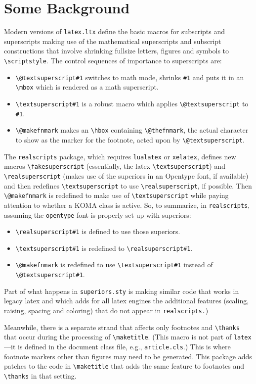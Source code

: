 \documentclass[11pt]{article}
\begin{document}
\section*{Some Background}
Modern versions of {\tt latex.ltx} define the basic macros for subscripts and superscripts making use of the mathematical superscripts and subscript constructions that involve shrinking fullsize letters, figures and symbols to \verb|\scriptstyle|. The control sequences of importance to superscripts are:
\begin{itemize}
\item
\verb|\@textsuperscript#1| switches to math mode, shrinks \verb|#1| and puts it in an \verb|\mbox| which is rendered as a math superscript.
\item 
\verb|\textsuperscript#1| is a robust macro which applies \verb|\@textsuperscript| to \verb|#1|.
\item 
\verb|\@makefnmark| makes an \verb|\hbox| containing  \verb|\@thefnmark|, the actual character to show as the marker for the footnote, acted upon by \verb|\@textsuperscript|. 
\end{itemize}
The {\tt realscripts} package, which requires {\tt lualatex} or {\tt xelatex}, defines new macros \verb|\fakesuperscript| (essentially, the latex \verb|\textsuperscript|) and \verb|\realsuperscript| (makes use of the superiors in an Opentype font, if available) and then redefines \verb|\textsuperscript| to use \verb|\realsuperscript|, if possible. Then \verb|\@makefnmark| is redefined to make use of \verb|\textsuperscript| while paying attention to whether a KOMA class is active. So, to summarize, in {\tt realscripts}, assuming the {\tt opentype} font is properly set up with superiors:
\begin{itemize}
\item
\verb|\realsuperscript#1| is defined to use those superiors.
\item
\verb|\textsuperscript#1| is redefined to \verb|\realsuperscript#1|.
\item
\verb|\@makefnmark| is redefined to use \verb|\textsuperscript#1| instead of \verb|\@textsuperscript#1|.
\end{itemize}

Part of what happens in {\tt superiors.sty} is making similar code that works in legacy latex and which adds for all latex engines the additional features (scaling, raising, spacing and coloring) that do not appear in {\tt realscripts.})

Meanwhile, there is a separate strand that affects only footnotes and \verb|\thanks| that occur during the processing of \verb|\maketitle|. (This macro is not part of {\tt latex}---it is defined in the document class file, e.g., {\tt article.cls}.) This is where footnote markers other than figures may need to be generated. This package adds patches to the code in \verb|\maketitle| that adds the same feature to footnotes and \verb|\thanks| in that setting.
\end{document}
